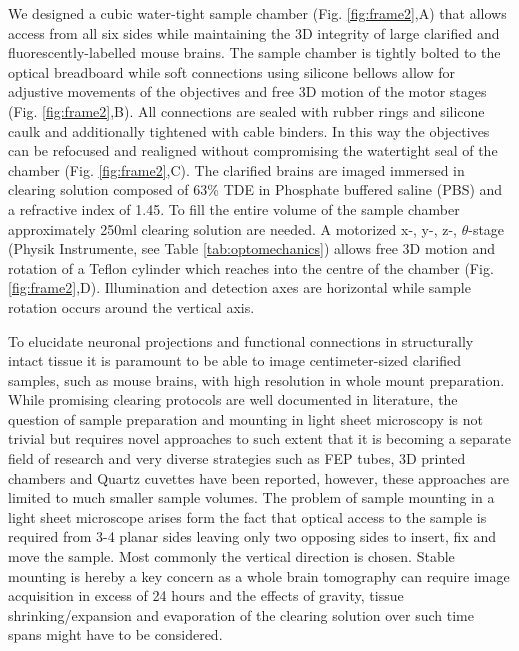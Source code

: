 \documentclass[12pt]{spieman}  %
\begin{document}
We designed a cubic water-tight sample chamber (Fig. \ref{fig:frame2},A) that allows access from all six sides while maintaining the 3D integrity of large clarified and fluorescently-labelled mouse brains. The sample chamber is tightly bolted  to the optical breadboard while soft connections using silicone bellows allow for adjustive movements of the objectives and free 3D motion of the motor stages (Fig. \ref{fig:frame2},B). All connections are sealed with rubber rings and silicone caulk and additionally tightened with cable binders. In this way the objectives can be refocused and realigned without compromising the watertight seal of the chamber (Fig. \ref{fig:frame2},C). The clarified brains are imaged immersed in clearing solution composed of 63\% TDE in Phosphate buffered saline (PBS) and a refractive index of 1.45. To fill the entire volume of the sample chamber approximately 250ml clearing solution are needed. A motorized x-, y-, z-, $\theta$-stage (Physik Instrumente, see Table \ref{tab:optomechanics}) allows free 3D motion and rotation of a Teflon cylinder which reaches into the centre of the chamber (Fig. \ref{fig:frame2},D). Illumination and detection axes are horizontal while sample rotation occurs around the vertical axis.		
		
To elucidate neuronal projections and functional connections in structurally intact tissue it is paramount to be able to image centimeter-sized clarified samples, such as mouse brains, with high resolution in whole mount preparation. While promising clearing protocols are well documented in literature\cite{Chung2013,Tomer2014}, the question of sample preparation and mounting in light sheet microscopy is not trivial but requires novel approaches to such extent that it is becoming a separate field of research and very diverse strategies such as FEP tubes, 3D printed chambers and Quartz cuvettes have been reported\cite{Kaufmann2012,Pitrone2013,Olarte2012,Tomer2014}, however, these approaches are limited to much smaller sample volumes. The problem of sample mounting in a light sheet microscope arises form the fact that optical access to the sample is required from 3-4 planar sides leaving only two opposing sides to insert, fix and move the sample. Most commonly the vertical direction is chosen. Stable mounting is hereby a key concern as a whole brain tomography can require image acquisition in excess of 24 hours and the effects of gravity, tissue shrinking/expansion and evaporation of the clearing solution over such time spans might have to be considered. 
\end{document}

